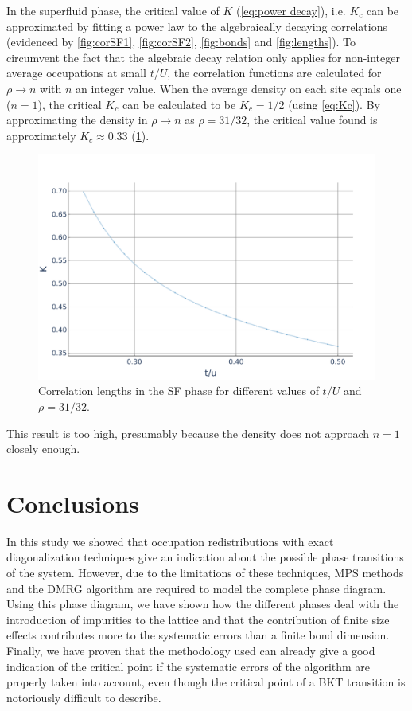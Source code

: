 \documentclass[twoside,twocolumn,9pt]{article}
\begin{document}
In the superfluid phase, the critical value of $K$ (\cref{eq:power decay}), i.e. $K_c$ can be approximated by fitting a power law to the algebraically decaying correlations (evidenced by \cref{fig:corSF1}, \cref{fig:corSF2}, \cref{fig:bonds} and \cref{fig:lengths}). To circumvent the fact that the algebraic decay relation only applies for non-integer average occupations at small $t/U$, the correlation functions are calculated for $\rho\rightarrow n$ with $n$ an integer value. When the average density on each site equals one ($n=1$), the critical $K_c$ can be calculated to be $K_c=1/2$ (using \cref{eq:Kc}). By approximating the density in $\rho\rightarrow n$ as $\rho=31/32$, the critical value found is approximately $K_c\approx 0.33$ (\cref{fig:K values}).
\begin{center}
  \begin{figure}
      \includegraphics[width=\linewidth]{../code/figures/Correlations-K-values.pdf}
      \caption{Correlation lengths in the SF phase for different values of $t/U$ and $\rho=31/32$.}
      \label{fig:K values}
  \end{figure}
\end{center}
This result is too high, presumably because the density does not approach $n=1$ closely enough.

\section{Conclusions}

In this study we showed that occupation redistributions with exact diagonalization techniques give an indication about the possible phase transitions of the system. However, due to the limitations of these techniques, MPS methods and the DMRG algorithm are required to model the complete phase diagram. Using this phase diagram, we have shown how the different phases deal with the introduction of impurities to the lattice and that the contribution of finite size effects contributes more to the systematic errors than a finite bond dimension. Finally, we have proven that the methodology used can already give a good indication of the critical point if the systematic errors of the algorithm are properly taken into account, even though the critical point of a BKT transition is notoriously difficult to describe.
\end{document}
